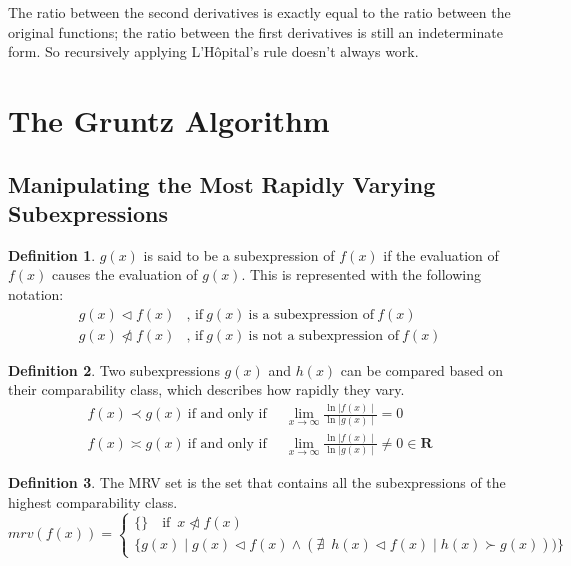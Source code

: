 \documentclass{article}
\theoremstyle{plain}
\theoremstyle{definition}
\newtheorem*{defn*}{Definition}
\theoremstyle{algorithm}
\begin{document}
	The ratio between the second derivatives is exactly equal to the ratio between the original functions; the ratio between the first derivatives is still an indeterminate form.
	So recursively applying L'Hôpital's rule doesn't always work.
	
	\section{The Gruntz Algorithm}
	
	\subsection{Manipulating the Most Rapidly Varying Subexpressions}
	
	\begin{defn*}
		\(g(x)\) is said to be a subexpression of \(f(x)\) if the evaluation of \(f(x)\) causes the evaluation of \(g(x)\). This is represented with the following notation:
		\[
		\begin{aligned}
			g(x) \triangleleft f(x)&\text{, if} \: g(x) \: \text{is a subexpression of} \: f(x) \\
			g(x) \ntriangleleft f(x)&\text{, if} \: g(x) \: \text{is not a subexpression of} \: f(x)
		\end{aligned}
		\]
	\end{defn*}
	
	\begin{defn*}
		Two subexpressions \(g(x)\) and \(h(x)\) can be compared based on their comparability class, which describes how rapidly they vary.
		\[
		\begin{aligned}
			f(x) \prec g(x) \: \text{if and only if} \enspace &\lim_{x \to \infty}{\frac{\ln{\mid f(x)\mid}}{\ln{\mid g(x)\mid}}} = 0 \\ 
			f(x) \asymp g(x) \: \text{if and only if} \enspace &\lim_{x \to \infty}{\frac{\ln{\mid f(x)\mid}}{\ln{\mid g(x)\mid}}} \neq 0 \in \mathbf{R}
		\end{aligned} \tag{2} \label{defn:comparability}
		\] 
	\end{defn*} 
	
	\begin{defn*}
		The MRV set is the set that contains all the subexpressions of the highest comparability class.
		\[
		mrv(f(x)) = \begin{cases}
			\{\} \quad \text{if} \enspace x \ntriangleleft f(x) \\
			\{g(x) \mid g(x) \triangleleft f(x) \wedge (\nexists \enspace h(x) \triangleleft f(x) \mid h(x) \succ g(x)))\}
		\end{cases}
		\]
	\end{defn*} \label{defn:mrv}
	
\end{document}
